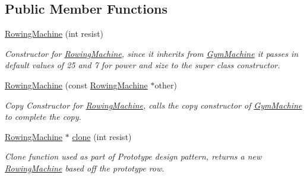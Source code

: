 \subsection*{Public Member Functions}
\begin{DoxyCompactItemize}
\item 
\hypertarget{class_rowing_machine_a93540e47856483f363f7479bde8990e4}{}\hyperlink{class_rowing_machine_a93540e47856483f363f7479bde8990e4}{Rowing\+Machine} (int resist)\label{class_rowing_machine_a93540e47856483f363f7479bde8990e4}

\begin{DoxyCompactList}\small\item\em Constructor for \hyperlink{class_rowing_machine}{Rowing\+Machine}, since it inherits from \hyperlink{class_gym_machine}{Gym\+Machine} it passes in default values of 25 and 7 for power and size to the super class constructor. \end{DoxyCompactList}\item 
\hypertarget{class_rowing_machine_a53fae8a736890b349d9fee54c11dd182}{}\hyperlink{class_rowing_machine_a53fae8a736890b349d9fee54c11dd182}{Rowing\+Machine} (const \hyperlink{class_rowing_machine}{Rowing\+Machine} $\ast$other)\label{class_rowing_machine_a53fae8a736890b349d9fee54c11dd182}

\begin{DoxyCompactList}\small\item\em Copy Constructor for \hyperlink{class_rowing_machine}{Rowing\+Machine}, calls the copy constructor of \hyperlink{class_gym_machine}{Gym\+Machine} to complete the copy. \end{DoxyCompactList}\item 
\hypertarget{class_rowing_machine_a494a8b0cc7a5ada40cb9cce3f1f8a2eb}{}\hyperlink{class_rowing_machine}{Rowing\+Machine} $\ast$ \hyperlink{class_rowing_machine_a494a8b0cc7a5ada40cb9cce3f1f8a2eb}{clone} (int resist)\label{class_rowing_machine_a494a8b0cc7a5ada40cb9cce3f1f8a2eb}

\begin{DoxyCompactList}\small\item\em Clone function used as part of Prototype design pattern, returns a new \hyperlink{class_rowing_machine}{Rowing\+Machine} based off the prototype \textquotesingle{}row\textquotesingle{}. \end{DoxyCompactList}\end{DoxyCompactItemize}
